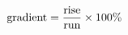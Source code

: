 \documentclass{article}
\begin{document}
\begin{align*}
\special{dvisvgm:raw <g id='unique000'>}\text{gradient}=\frac{\text{rise}}{\text{run}}\times100\%\special{dvisvgm:raw </g>}
\end{align*}
\end{document}
